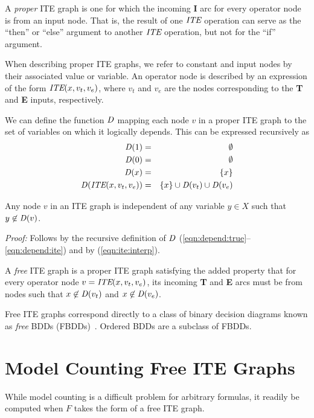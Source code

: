 \documentclass{llncs}
\newcommand{\tautology}{1}
\newcommand{\nil}{0}
\newcommand{\ite}{\mbox{\it ITE}}
\newcommand{\ifarg}{\textbf{I}}
\newcommand{\thenarg}{\textbf{T}}
\newcommand{\elsearg}{\textbf{E}}
\newcommand{\depend}{{\it D}}
\begin{document}
A {\em proper} ITE graph is one for which the incoming \ifarg{} arc for every operator node is
from an input node.  That is, the result of one $\ite$ operation can
serve as the ``then'' or ``else'' argument to another $\ite$
operation, but not for the ``if'' argument.

When describing proper ITE graphs, we refer to constant and input
nodes by their associated value or variable.  An operator node is described by an expression of the form
$\ite(x, v_t, v_e)$, where $v_t$ and $v_e$ are the
nodes corresponding to the \thenarg{} and \elsearg{} inputs, respectively.

We can define the function $\depend$ mapping each node
$v$ in a proper ITE graph to the set of variables on which it logically depends.  This can be expressed recursively as
\begin{eqnarray}
\depend(\tautology) & = & \emptyset \label{eqn:depend:true}\\
\depend(\nil) & = & \emptyset \label{eqn:depend:false}\\
\depend(x) & = & \{x \} \label{eqn:depend:variable}\\
\depend(\ite(x, v_t, v_e)) & = & \{ x \} \cup \depend(v_t) \cup \depend(v_e) \label{eqn:depend:ite}
\end{eqnarray}  


\begin{lemma}
\label{lemma:independent:dset}
Any node $v$ in an ITE graph is independent of any variable $y \in X$ such that $y \not \in \depend(v)$.
\end{lemma}  
\noindent
{\em Proof:} Follows by the recursive definition of $\depend$ (\ref{eqn:depend:true}--\ref{eqn:depend:ite}) and by (\ref{eqn:ite:interp}).


A {\em free} ITE graph is a proper ITE graph satisfying the added
property that for every operator node $v = \ite(x, v_t, v_e)$, its
incoming \thenarg{} and \elsearg{} arcs must be from nodes such that
$x \not \in \depend(v_t)$ and $x \not \in \depend(v_e)$.

Free ITE graphs correspond directly to a class of binary decision diagrams known as {\em free} BDDs (FBDDs)~\cite{gergov:ieeetc:1994}.  Ordered BDDs are a subclass of FBDDs.

\section{Model Counting Free ITE Graphs}

While model counting is a difficult problem for arbitrary
formulas, it readily be computed when $F$ takes the form of a free
ITE graph.
\end{document}
